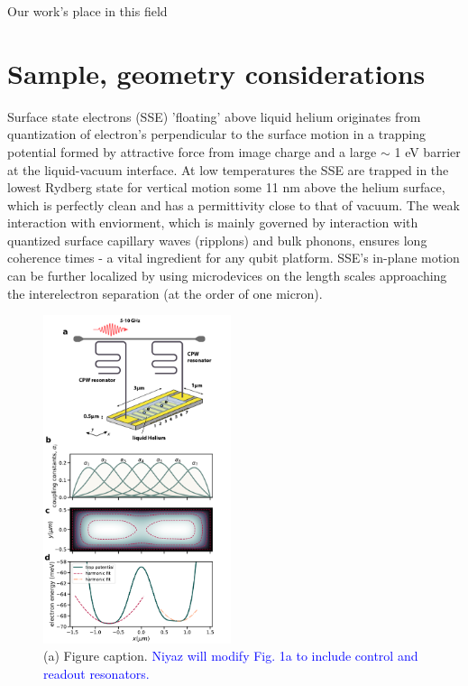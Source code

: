 \documentclass[twocolumn,superscriptaddress,unsortedaddress,
 amsmath,amssymb,
 aps,
]{revtex4-2}
\begin{document}
Our work's place in this field


\section{Sample, geometry considerations} %
Surface state electrons (SSE) 'floating' above liquid helium originates from quantization of electron's perpendicular to the surface motion in a trapping potential formed by attractive force from image charge and a large $\sim$ 1 eV barrier at the liquid-vacuum interface. At low temperatures the SSE are trapped in the lowest Rydberg state for vertical motion some 11 nm above the helium surface, which is perfectly clean and has a permittivity close to that of vacuum. The weak interaction with enviorment, which is mainly governed by interaction with quantized surface capillary waves (ripplons) and bulk phonons, ensures long coherence times - a vital ingredient for any qubit platform. SSE's in-plane motion can be further localized by using microdevices on the length scales approaching the interelectron separation (at the order of one micron). 

\begin{figure}
\includegraphics[width=0.49\textwidth]{figure1.pdf}
\caption{\label{fig3} (a) Figure caption. \textcolor{blue}{Niyaz will modify Fig. 1a to include control and readout resonators.}}
\end{figure}
\end{document}
